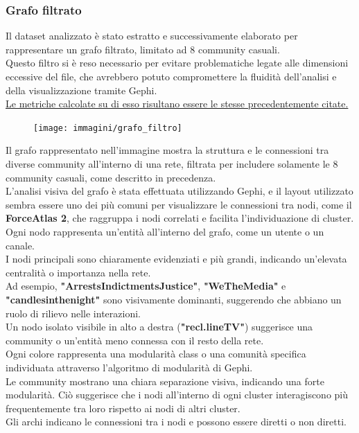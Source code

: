 \documentclass[12pt]{article}
\begin{document}
	\subsubsection{Grafo filtrato}
Il dataset analizzato è stato estratto e successivamente elaborato per rappresentare un grafo filtrato, limitato ad 8 community casuali.\\
Questo filtro si è reso necessario per evitare problematiche legate alle dimensioni eccessive del file, che avrebbero potuto compromettere la fluidità dell'analisi e della visualizzazione tramite Gephi.\\
\underline{Le metriche calcolate su di esso risultano essere le stesse precedentemente citate.}
\begin{figure}[H]
	\centering
	\texttt{[image: immagini/grafo\_filtro]}
\end{figure}
Il grafo rappresentato nell'immagine mostra la struttura e le connessioni tra diverse community all'interno di una rete, filtrata per includere solamente le 8 community casuali, come descritto in precedenza.\\
L'analisi visiva del grafo è stata effettuata utilizzando Gephi, e il layout utilizzato sembra essere uno dei più comuni per visualizzare le connessioni tra nodi, come il \textbf{ForceAtlas 2}, che raggruppa i nodi correlati e facilita l'individuazione di cluster.\\
Ogni nodo rappresenta un'entità all'interno del grafo, come un utente o un canale.\\
I nodi principali sono chiaramente evidenziati e più grandi, indicando un'elevata centralità o importanza nella rete. \\Ad esempio, \textbf{"ArrestsIndictmentsJustice"}, \textbf{"WeTheMedia"} e \textbf{"candlesinthenight"} sono visivamente dominanti, suggerendo che abbiano un ruolo di rilievo nelle interazioni.\\
Un nodo isolato visibile in alto a destra (\textbf{"recl.lineTV"}) suggerisce una community o un'entità meno connessa con il resto della rete.\\
Ogni colore rappresenta una modularità class o una comunità specifica individuata attraverso l'algoritmo di modularità di Gephi.\\
Le community mostrano una chiara separazione visiva, indicando una forte modularità. Ciò suggerisce che i nodi all'interno di ogni cluster interagiscono più frequentemente tra loro rispetto ai nodi di altri cluster.\\
Gli archi indicano le connessioni tra i nodi e possono essere diretti o non diretti.\\
\end{document}
